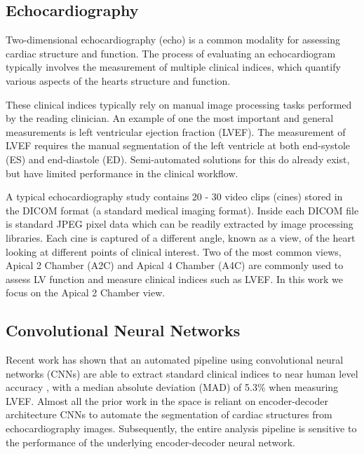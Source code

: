 \subsection{Echocardiography}
Two-dimensional echocardiography (echo) is a common modality for assessing
cardiac structure and function. The process of evaluating an echocardiogram
typically involves the measurement of multiple clinical indices, which quantify
various aspects of the hearts structure and function. \newline

These clinical indices typically rely on manual image processing tasks performed
by the reading clinician. An example of one the most important and general
measurements is left ventricular ejection fraction (LVEF). The measurement of
LVEF requires the manual segmentation of the left ventricle at both end-systole
(ES) and end-diastole (ED). Semi-automated solutions for this do already exist,
but have limited performance in the clinical workflow. \newline

A typical echocardiography study contains 20 - 30 video clips (cines) stored in
the DICOM format (a standard medical imaging format). Inside each DICOM file is
standard JPEG pixel data which can be readily extracted by image processing
libraries. Each cine is captured of a different angle, known as a view, of the
heart looking at different points of clinical interest. Two of the most common
views, Apical 2 Chamber (A2C) and Apical 4 Chamber (A4C) are commonly used to
assess LV function and measure clinical indices such as LVEF. In this work we
focus on the Apical 2 Chamber view.\newline

\subsection{Convolutional Neural Networks}

Recent work has shown that an automated pipeline using convolutional neural
networks (CNNs) are able to extract standard clinical indices to near human
level accuracy \cite{zhangFullyAutomatedEchocardiogram2018}, with a median
absolute deviation (MAD) of 5.3\% when measuring LVEF. Almost all the prior work
in the space is reliant on encoder-decoder architecture CNNs to automate the
segmentation of cardiac structures from echocardiography images. Subsequently,
the entire analysis pipeline is sensitive to the performance of the underlying
encoder-decoder neural network. \newline

